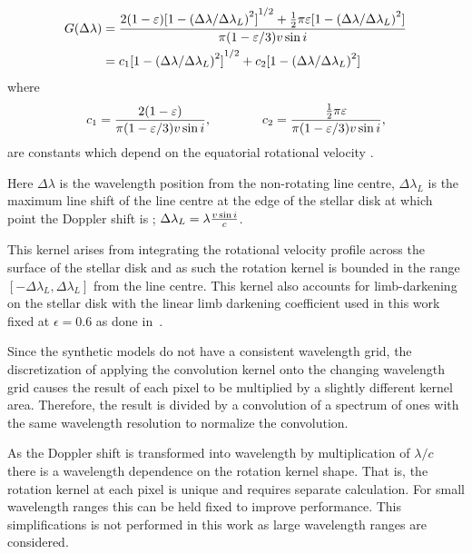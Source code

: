 {

\begin{align}
G(\Delta\lambda) &= \frac{2(1-\varepsilon){[1-{(\Delta\lambda /{\Delta\lambda}_{L})}^{2}]}^{1/2} +   \frac{1}{2}\pi\varepsilon[1-{(\Delta\lambda /{\Delta\lambda}_{L})}^{2}]}{\pi (1-\varepsilon/3) v\sin{i}}\\
      &= c_{1}{[1- {(\Delta\lambda /\Delta\lambda_{L})}^{2}]}^{1/2} + c_{2}[1-{(\Delta\lambda /\Delta\lambda_{L})}^{2}] \label{eqn:rotational_profile}
\end{align}
where
\begin{equation}
{c}_{1} = \frac{2(1-\varepsilon)} {\pi (1-\varepsilon/3)v\sin{i}},  \hspace{4em} {c}_{2} = \frac{\frac{1}{2}\pi\varepsilon} {\pi (1-\varepsilon/3)v\sin{i}},
\end{equation}
are constants which depend on the equatorial rotational velocity \Vsini{}.

Here $\Delta\lambda$ is the wavelength position from the non-rotating line centre, $\Delta\lambda_{L}$ is the maximum line shift of the line centre at the edge of the stellar disk at which point the Doppler shift is  \Vsini{}; $\Delta\lambda_{L} = \lambda \frac{v\sin{i}}{c}$.

This kernel arises from integrating the rotational velocity profile across the surface of the stellar disk and as such the rotation kernel is bounded in the range  $[-\Delta\lambda_L, \Delta\lambda_{L}]$ from the line centre.
This kernel also accounts for limb-darkening on the stellar disk with the linear limb darkening coefficient used in this work fixed at $\epsilon=0.6$ as done in~\citet{figueira_radial_2016}.

Since the synthetic models do not have a consistent wavelength grid, the discretization of applying the convolution kernel onto the changing wavelength grid causes the result of each pixel to be multiplied by a slightly different kernel area.
Therefore, the result is divided by a convolution of a spectrum of ones with the same wavelength resolution to normalize the convolution.

As the Doppler shift \Vsini{} is transformed into wavelength by multiplication of $\lambda  / c$ there is a wavelength dependence on the rotation kernel shape.
That is, the rotation kernel at each pixel is unique and requires separate calculation.
For small wavelength ranges this can be held fixed to improve performance.
This simplifications is not performed in this work as large wavelength ranges are considered.


}
